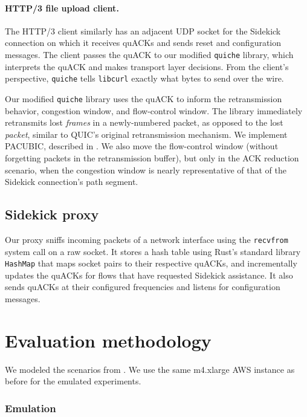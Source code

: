 \paragraph{HTTP/3 file upload client.}
The HTTP/3 client similarly has an adjacent UDP socket for the Sidekick connection on
which it receives quACKs and sends reset and configuration messages. The client
passes the quACK to our modified \texttt{quiche} library, which interprets the
quACK and makes transport layer decisions. From the client's perspective,
\texttt{quiche} tells \texttt{libcurl} exactly what bytes to send over the wire.

Our modified \texttt{quiche} library uses the quACK to inform the
retransmission behavior, congestion window, and flow-control window. The library
immediately retransmits lost \emph{frames} in a newly-numbered
packet, as opposed to the lost \emph{packet}, similar to QUIC's original
retransmission mechanism. We implement PACUBIC,
described in .
We also move the flow-control window (without forgetting packets in the
retransmission buffer), but only in the ACK reduction scenario, when the
congestion window is nearly representative of that of the Sidekick connection's
path segment.

\subsection{Sidekick proxy}
\label{sec:sidekick:implementation:proxy}

Our proxy sniffs incoming packets of a network interface using the
\texttt{recvfrom} system call on a raw socket.
It stores a hash table using Rust's standard library \texttt{HashMap} that maps
socket pairs to their respective quACKs, and
incrementally updates the quACKs for flows that have requested Sidekick assistance.
It also sends quACKs at their configured frequencies and listens for
configuration messages.

\section{Evaluation methodology}
\label{sec:sidekick:methodology}

We modeled the scenarios from . We use the same
m4.xlarge AWS instance as before for the emulated experiments.

\subsubsection{Emulation}

